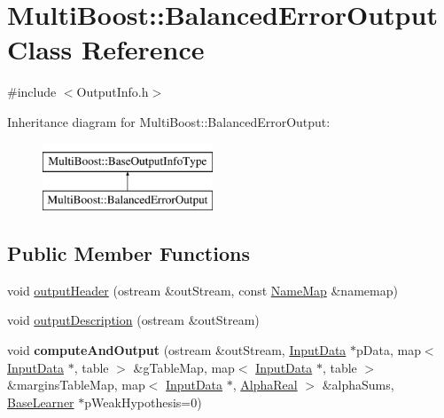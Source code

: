 \hypertarget{classMultiBoost_1_1BalancedErrorOutput}{\section{Multi\-Boost\-:\-:Balanced\-Error\-Output Class Reference}
\label{classMultiBoost_1_1BalancedErrorOutput}
}


{\ttfamily \#include $<$Output\-Info.\-h$>$}

Inheritance diagram for Multi\-Boost\-:\-:Balanced\-Error\-Output\-:\begin{figure}[H]
\begin{center}
\leavevmode
\includegraphics[height=2.000000cm]{classMultiBoost_1_1BalancedErrorOutput}
\end{center}
\end{figure}
\subsection*{Public Member Functions}
\begin{DoxyCompactItemize}
\item 
void \hyperlink{classMultiBoost_1_1BalancedErrorOutput_a8a88ddc687b1d6f04a9720f54f249efa}{output\-Header} (ostream \&out\-Stream, const \hyperlink{classMultiBoost_1_1NameMap}{Name\-Map} \&namemap)
\item 
void \hyperlink{classMultiBoost_1_1BalancedErrorOutput_ace3ff3e4eeb7f7a1697e914963c85e40}{output\-Description} (ostream \&out\-Stream)
\item 
\hypertarget{classMultiBoost_1_1BalancedErrorOutput_a584908c8940256e465b352852fc93d37}{void {\bfseries compute\-And\-Output} (ostream \&out\-Stream, \hyperlink{classMultiBoost_1_1InputData}{Input\-Data} $\ast$p\-Data, map$<$ \hyperlink{classMultiBoost_1_1InputData}{Input\-Data} $\ast$, table $>$ \&g\-Table\-Map, map$<$ \hyperlink{classMultiBoost_1_1InputData}{Input\-Data} $\ast$, table $>$ \&margins\-Table\-Map, map$<$ \hyperlink{classMultiBoost_1_1InputData}{Input\-Data} $\ast$, \hyperlink{Defaults_8h_a80184c4fd10ab70a1a17c5f97dcd1563}{Alpha\-Real} $>$ \&alpha\-Sums, \hyperlink{classMultiBoost_1_1BaseLearner}{Base\-Learner} $\ast$p\-Weak\-Hypothesis=0)}\label{classMultiBoost_1_1BalancedErrorOutput_a584908c8940256e465b352852fc93d37}

\end{DoxyCompactItemize}
